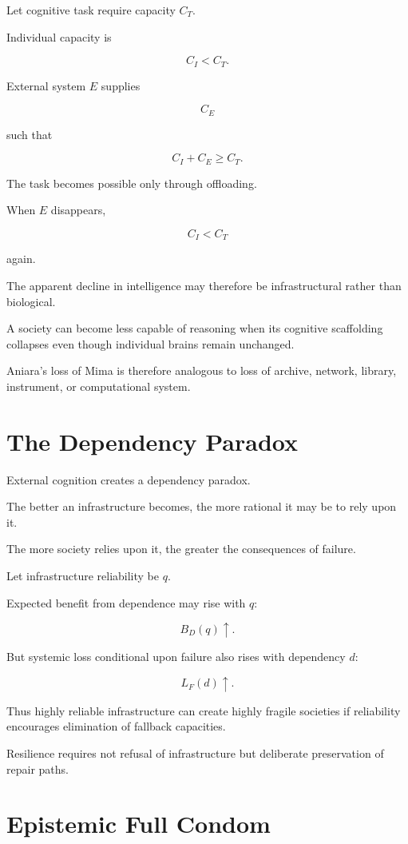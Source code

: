 \documentclass[11pt,oneside]{book}
\theoremstyle{definition}
\theoremstyle{remark}
\begin{document}
Let cognitive task require capacity \(C_T\).

Individual capacity is

\[
C_I<C_T.
\]

External system \(E\) supplies

\[
C_E
\]

such that

\[
C_I+C_E\geq C_T.
\]

The task becomes possible only through offloading.

When \(E\) disappears,

\[
C_I<C_T
\]

again.

The apparent decline in intelligence may therefore be infrastructural rather than biological.

A society can become less capable of reasoning when its cognitive scaffolding collapses even though individual brains remain unchanged.

Aniara's loss of Mima is therefore analogous to loss of archive, network, library, instrument, or computational system.

\section{The Dependency Paradox}

External cognition creates a dependency paradox.

The better an infrastructure becomes, the more rational it may be to rely upon it.

The more society relies upon it, the greater the consequences of failure.

Let infrastructure reliability be \(q\).

Expected benefit from dependence may rise with \(q\):

\[
B_D(q)\uparrow.
\]

But systemic loss conditional upon failure also rises with dependency \(d\):

\[
L_F(d)\uparrow.
\]

Thus highly reliable infrastructure can create highly fragile societies if reliability encourages elimination of fallback capacities.

Resilience requires not refusal of infrastructure but deliberate preservation of repair paths.

\section{Epistemic Full Condom}
\end{document}
